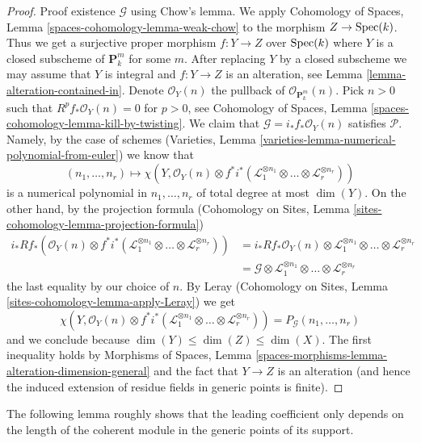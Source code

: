 \begin{proof}
\medskip\noindent
Proof existence $\mathcal{G}$ using Chow's lemma. We apply
Cohomology of Spaces, Lemma \ref{spaces-cohomology-lemma-weak-chow}
to the morphism $Z \to \mathop{\mathrm{Spec}}(k)$. Thus we get a
surjective proper morphism $f : Y \to Z$ over $\mathop{\mathrm{Spec}}(k)$
where $Y$ is a closed subscheme of $\mathbf{P}^m_k$ for some $m$.
After replacing $Y$ by a closed subscheme we may assume that $Y$
is integral and $f : Y \to Z$ is an alteration, see
Lemma \ref{lemma-alteration-contained-in}.
Denote $\mathcal{O}_Y(n)$ the pullback of $\mathcal{O}_{\mathbf{P}^m_k}(n)$.
Pick $n > 0$ such that $R^pf_*\mathcal{O}_Y(n) = 0$
for $p > 0$, see Cohomology of Spaces, Lemma
\ref{spaces-cohomology-lemma-kill-by-twisting}.
We claim that $\mathcal{G} = i_*f_*\mathcal{O}_Y(n)$ satisfies $\mathcal{P}$.
Namely, by the case of schemes
(Varieties, Lemma \ref{varieties-lemma-numerical-polynomial-from-euler})
we know that
$$
(n_1, \ldots, n_r)
\longmapsto
\chi(Y, \mathcal{O}_Y(n) \otimes
f^*i^*(\mathcal{L}_1^{\otimes n_1} \otimes \ldots \otimes
\mathcal{L}_r^{\otimes n_r}))
$$
is a numerical polynomial in $n_1, \ldots, n_r$ of total degree at
most $\dim(Y)$. On the other hand, by the projection formula
(Cohomology on Sites, Lemma \ref{sites-cohomology-lemma-projection-formula})
\begin{align*}
i_*Rf_*\left(
\mathcal{O}_Y(n) \otimes
f^*i^*(\mathcal{L}_1^{\otimes n_1} \otimes \ldots \otimes
\mathcal{L}_r^{\otimes n_r})\right)
& =
i_*Rf_*\mathcal{O}_Y(n) \otimes
\mathcal{L}_1^{\otimes n_1} \otimes \ldots \otimes
\mathcal{L}_r^{\otimes n_r} \\
& =
\mathcal{G} \otimes \mathcal{L}_1^{\otimes n_1} \otimes \ldots \otimes
\mathcal{L}_r^{\otimes n_r}
\end{align*}
the last equality by our choice of $n$. By
Leray (Cohomology on Sites, Lemma \ref{sites-cohomology-lemma-apply-Leray})
we get
$$
\chi(Y, \mathcal{O}_Y(n) \otimes
f^*i^*(\mathcal{L}_1^{\otimes n_1} \otimes \ldots \otimes
\mathcal{L}_r^{\otimes n_r})) =
P_\mathcal{G}(n_1, \ldots, n_r)
$$
and we conclude because $\dim(Y) \leq \dim(Z) \leq \dim(X)$.
The first inequality holds by
Morphisms of Spaces, Lemma
\ref{spaces-morphisms-lemma-alteration-dimension-general}
and the fact that $Y \to Z$ is an alteration (and hence the
induced extension of residue fields in generic points is finite).
\end{proof}

\noindent
The following lemma roughly shows that the leading coefficient only depends
on the length of the coherent module in the generic points of its
support.

